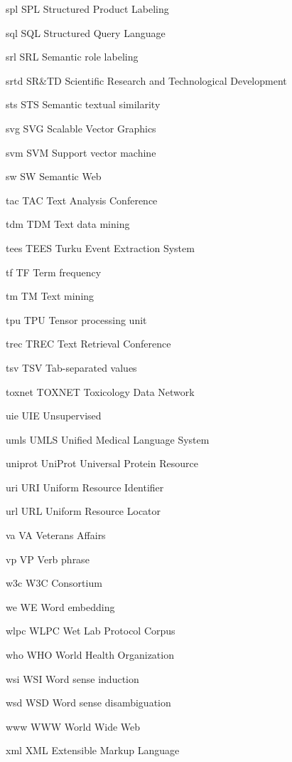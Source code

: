 \newabbreviation
{spl}
{SPL}
{Structured Product Labeling}

\newabbreviation
{sql}
{SQL}
{Structured Query Language}

\newabbreviation
{srl}
{SRL}
{Semantic role labeling}

\newabbreviation
{srtd}
{SR\&TD}
{Scientific Research and Technological Development}

\newabbreviation
{sts}
{STS}
{Semantic textual similarity}

\newabbreviation
{svg}
{SVG}
{Scalable Vector Graphics}

\newabbreviation
{svm}
{SVM}
{Support vector machine}

\newabbreviation
{sw}
{SW}
{Semantic Web}

\newabbreviation
{tac}
{TAC}
{Text Analysis Conference}

\newabbreviation
{tdm}
{TDM}
{Text data mining}

\newabbreviation
{tees}
{TEES}
{Turku Event Extraction System}

\newabbreviation
{tf}
{TF}
{Term frequency}

\newabbreviation
{tm}
{TM}
{Text mining}

\newabbreviation
{tpu}
{TPU}
{Tensor processing unit}

\newabbreviation
{trec}
{TREC}
{Text Retrieval Conference}

\newabbreviation
{tsv}
{TSV}
{Tab-separated values}

\newabbreviation
{toxnet}
{TOXNET}
{Toxicology Data Network}

\newabbreviation
{uie}
{UIE}
{Unsupervised }

\newabbreviation
{umls}
{UMLS}
{Unified Medical Language System}

\newabbreviation
{uniprot}
{UniProt}
{Universal Protein Resource}

\newabbreviation
{uri}
{URI}
{Uniform Resource Identifier}

\newabbreviation
{url}
{URL}
{Uniform Resource Locator}

\newabbreviation
{va}
{VA}
{Veterans Affairs}

\newabbreviation
{vp}
{VP}
{Verb phrase}

\newabbreviation
{w3c}
{W3C}
{ Consortium}

\newabbreviation
{we}
{WE}
{Word embedding}

\newabbreviation
{wlpc}
{WLPC}
{Wet Lab Protocol Corpus}

\newabbreviation
{who}
{WHO}
{World Health Organization}

\newabbreviation
{wsi}
{WSI}
{Word sense induction}

\newabbreviation
{wsd}
{WSD}
{Word sense disambiguation}

\newabbreviation
{www}
{WWW}
{World Wide Web}

\newabbreviation
{xml}
{XML}
{Extensible Markup Language}
